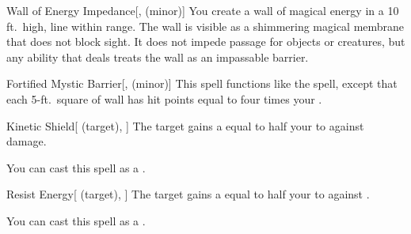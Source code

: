 \lowercase{\hypertarget{spell:Wall of Energy Impedance}{}}\label{spell:Wall of Energy Impedance}
\begin{freeability}[Rank 3]{\hypertarget{spell:Wall of Energy Impedance}{Wall of Energy Impedance}}[,  (minor)]
\targetrule
You create a wall of magical energy in a 10 ft.\ high, \areamed line within \rngmed range.
The wall is visible as a shimmering magical membrane that does not block sight.
It does not impede passage for objects or creatures, but any ability that deals  treats the wall as an impassable barrier.
\end{freeability}
\vspace{0.25em}



\lowercase{\hypertarget{spell:Fortified Mystic Barrier}{}}\label{spell:Fortified Mystic Barrier}
\begin{freeability}[Rank 4]{\hypertarget{spell:Fortified Mystic Barrier}{Fortified Mystic Barrier}}[,  (minor)]
\targetrule
This spell functions like the  spell, except that each 5-ft.\ square of wall has hit points equal to four times your .
\end{freeability}
\vspace{0.25em}



\lowercase{\hypertarget{spell:Kinetic Shield}{}}\label{spell:Kinetic Shield}
\begin{attuneability}[Rank 4]{\hypertarget{spell:Kinetic Shield}{Kinetic Shield}}[ (target), ]
The target gains a  equal to half your  to  against  damage.

You can cast this spell as a .
\end{attuneability}
\vspace{0.25em}



\lowercase{\hypertarget{spell:Resist Energy}{}}\label{spell:Resist Energy}
\begin{attuneability}[Rank 4]{\hypertarget{spell:Resist Energy}{Resist Energy}}[ (target), ]
The target gains a  equal to half your  to  against .

You can cast this spell as a .
\end{attuneability}
\vspace{0.25em}



